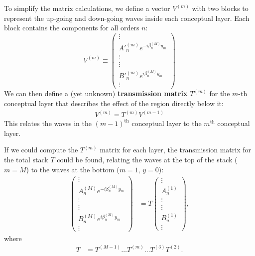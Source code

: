 To simplify the matrix calculations, we define a vector $V^{(m)}$ with two blocks to represent the up-going and down-going waves inside each conceptual layer.  Each block contains the components for all orders $n$:
\begin{equation}
V^{(m)} \equiv  \left(\begin{array}{c}\vdots \\ A'^{(m)}_n  e^{-i \beta^{(M)}_n y_m} \\ \vdots \\\hline \vdots \\ B'^{(m)}_n e^{i \beta^{(M)}_n y_m} \\ \vdots\end{array}\right) 
\end{equation}
We can then define a (yet unknown) \textbf{transmission matrix} $T^{(m)}$ for the $m$-th conceptual layer that describes the effect of the region directly below it:
\begin{align}
V^{(m)} = T^{(m)} V^{(m-1)}
\end{align}
This relates the waves in the $(m-1)^\textrm{th}$ conceptual layer to the $m^\textrm{th}$ conceptual layer.

If we could compute the $T^{(m)}$ matrix for each layer, the transmission matrix for the total stack $T$ could be found, relating the waves at the top of the stack ($m=M$) to the waves at the bottom ($m=1,\, y=0$):
\begin{align}
\left(\begin{array}{c}\vdots \\ A^{(M)}_n  e^{-i \beta^{(M)}_n y_m} \\ \vdots \\\hline \vdots \\ B^{(M)}_n e^{i \beta^{(M)}_n y_m} \\ \vdots\end{array}\right)  &= T \left(\begin{array}{c}\vdots \\ A^{(1)}_n \\ \vdots \\\hline \vdots \\ B^{(1)}_n \\ \vdots\end{array}\right),
\end{align}
where
\begin{align}
T &= T^{(M-1)} \ldots T^{(m)} \ldots T^{(3)} T^{(2)}.
\end{align}


